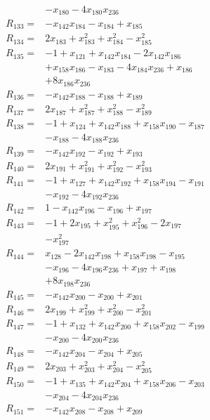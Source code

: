 \begin{align*}
&-x_{180} -4x_{180}x_{236}\\[3pt]
R_{133}={}&-x_{142}x_{184} -x_{184} +x_{185}\\[3pt]
R_{134}={}&2x_{183} +x_{183}^{2} +x_{184}^{2} -x_{185}^{2}\\[3pt]
R_{135}={}&-1 +x_{121} +x_{142}x_{184} -2x_{142}x_{186}\\
&+x_{158}x_{186} -x_{183} -4x_{184}x_{236} +x_{186}\\
&+8x_{186}x_{236}\\[3pt]
R_{136}={}&-x_{142}x_{188} -x_{188} +x_{189}\\[3pt]
R_{137}={}&2x_{187} +x_{187}^{2} +x_{188}^{2} -x_{189}^{2}\\[3pt]
R_{138}={}&-1 +x_{124} +x_{142}x_{188} +x_{158}x_{190} -x_{187}\\
&-x_{188} -4x_{188}x_{236}\\[3pt]
R_{139}={}&-x_{142}x_{192} -x_{192} +x_{193}\\[3pt]
R_{140}={}&2x_{191} +x_{191}^{2} +x_{192}^{2} -x_{193}^{2}\\[3pt]
R_{141}={}&-1 +x_{127} +x_{142}x_{192} +x_{158}x_{194} -x_{191}\\
&-x_{192} -4x_{192}x_{236}\\[3pt]
R_{142}={}&1 -x_{142}x_{196} -x_{196} +x_{197}\\[3pt]
R_{143}={}&-1 +2x_{195} +x_{195}^{2} +x_{196}^{2} -2x_{197}\\
&-x_{197}^{2}\\[3pt]
R_{144}={}&x_{128} -2x_{142}x_{198} +x_{158}x_{198} -x_{195}\\
&-x_{196} -4x_{196}x_{236} +x_{197} +x_{198}\\
&+8x_{198}x_{236}\\[3pt]
R_{145}={}&-x_{142}x_{200} -x_{200} +x_{201}\\[3pt]
R_{146}={}&2x_{199} +x_{199}^{2} +x_{200}^{2} -x_{201}^{2}\\[3pt]
R_{147}={}&-1 +x_{132} +x_{142}x_{200} +x_{158}x_{202} -x_{199}\\
&-x_{200} -4x_{200}x_{236}\\[3pt]
R_{148}={}&-x_{142}x_{204} -x_{204} +x_{205}\\[3pt]
R_{149}={}&2x_{203} +x_{203}^{2} +x_{204}^{2} -x_{205}^{2}\\[3pt]
R_{150}={}&-1 +x_{135} +x_{142}x_{204} +x_{158}x_{206} -x_{203}\\
&-x_{204} -4x_{204}x_{236}\\[3pt]
R_{151}={}&-x_{142}x_{208} -x_{208} +x_{209}\\[3pt]

\end{align*}
